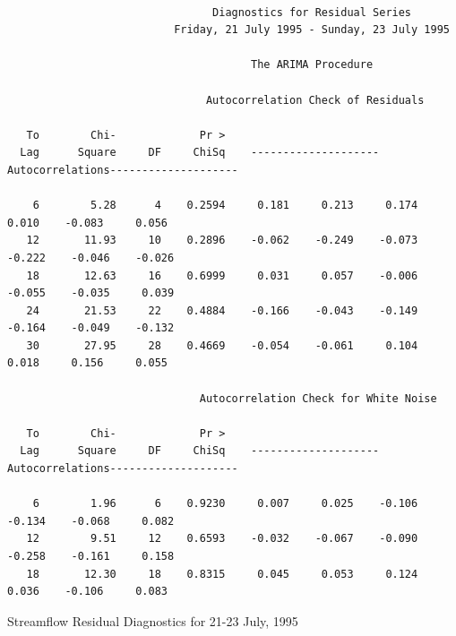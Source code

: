\documentclass[12pt]{report}
\begin{document}
\begin{table}
\scriptsize
\begin{centering}
\begin{verbatim}

                                Diagnostics for Residual Series
                          Friday, 21 July 1995 - Sunday, 23 July 1995

                                      The ARIMA Procedure

                               Autocorrelation Check of Residuals

   To        Chi-             Pr >
  Lag      Square     DF     ChiSq    --------------------Autocorrelations--------------------

    6        5.28      4    0.2594     0.181     0.213     0.174     0.010    -0.083     0.056
   12       11.93     10    0.2896    -0.062    -0.249    -0.073    -0.222    -0.046    -0.026
   18       12.63     16    0.6999     0.031     0.057    -0.006    -0.055    -0.035     0.039
   24       21.53     22    0.4884    -0.166    -0.043    -0.149    -0.164    -0.049    -0.132
   30       27.95     28    0.4669    -0.054    -0.061     0.104     0.018     0.156     0.055

                              Autocorrelation Check for White Noise

   To        Chi-             Pr >
  Lag      Square     DF     ChiSq    --------------------Autocorrelations--------------------

    6        1.96      6    0.9230     0.007     0.025    -0.106    -0.134    -0.068     0.082
   12        9.51     12    0.6593    -0.032    -0.067    -0.090    -0.258    -0.161     0.158
   18       12.30     18    0.8315     0.045     0.053     0.124     0.036    -0.106     0.083

\end{verbatim}
\end{centering}
\normalsize\caption{Streamflow Residual Diagnostics for 21-23
July, 1995 }\label{tab:JulstageResDiag}
\end{table}
\end{document}
